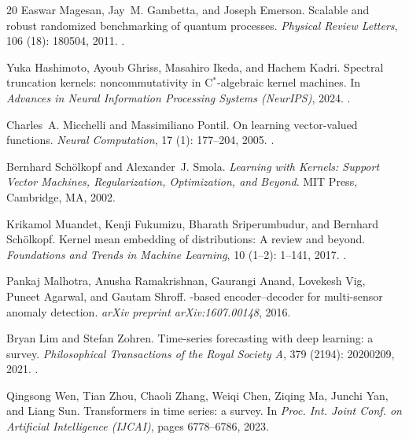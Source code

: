 \documentclass[
  aps,
  prresearch,
  reprint,
  amsmath,
  amssymb,
  nofootinbib,
  floatfix,
]{revtex4-2}
\begin{document}
\begin{thebibliography}{20}
Easwar Magesan, Jay~M. Gambetta, and Joseph Emerson.
\newblock Scalable and robust randomized benchmarking of quantum processes.
\newblock \emph{Physical Review Letters}, 106 (18): 180504,
  2011.
\newblock {}.

Yuka Hashimoto, Ayoub Ghriss, Masahiro Ikeda, and Hachem Kadri.
\newblock Spectral truncation kernels: noncommutativity in
  {C}$^\ast$-algebraic kernel machines.
\newblock In \emph{Advances in Neural Information Processing Systems (NeurIPS)},
  2024.
\newblock {}.

Charles~A. Micchelli and Massimiliano Pontil.
\newblock On learning vector-valued functions.
\newblock \emph{Neural Computation}, 17 (1): 177--204, 2005.
\newblock {}.

Bernhard Sch{\"o}lkopf and Alexander~J. Smola.
\newblock \emph{Learning with Kernels: Support Vector Machines, Regularization,
  Optimization, and Beyond}.
\newblock MIT Press, Cambridge, MA, 2002.

Krikamol Muandet, Kenji Fukumizu, Bharath Sriperumbudur, and Bernhard
  Sch{\"o}lkopf.
\newblock Kernel mean embedding of distributions: A review and beyond.
\newblock \emph{Foundations and Trends in Machine Learning}, 10
  (1--2): 1--141, 2017.
\newblock {}.

Pankaj Malhotra, Anusha Ramakrishnan, Gaurangi Anand, Lovekesh Vig, Puneet
  Agarwal, and Gautam Shroff.
-based encoder--decoder for multi-sensor anomaly detection.
\newblock \emph{arXiv preprint arXiv:1607.00148}, 2016.

Bryan Lim and Stefan Zohren.
\newblock Time-series forecasting with deep learning: a survey.
\newblock \emph{Philosophical Transactions of the Royal Society A},
  379 (2194): 20200209, 2021.
\newblock {}.

Qingsong Wen, Tian Zhou, Chaoli Zhang, Weiqi Chen, Ziqing Ma, Junchi Yan, and
  Liang Sun.
\newblock Transformers in time series: a survey.
\newblock In \emph{Proc. Int. Joint Conf. on Artificial Intelligence (IJCAI)},
  pages 6778--6786, 2023.


\end{thebibliography}
\end{document}
